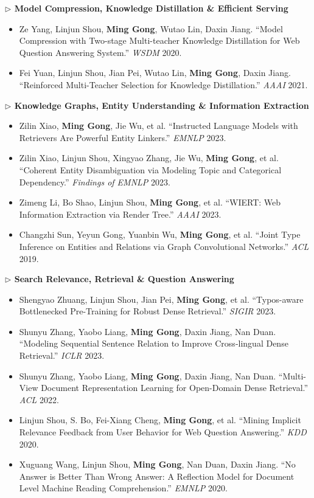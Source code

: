 \documentclass[10.5pt,letterpaper]{article}
\begin{document}
\noindent\textcolor{blue!60!black}{\textbf{$\triangleright$ Model Compression, Knowledge Distillation \& Efficient Serving}}
\begin{itemize}
  \item Ze Yang, Linjun Shou, \textbf{Ming Gong}, Wutao Lin, Daxin Jiang. ``Model Compression with Two-stage Multi-teacher Knowledge Distillation for Web Question Answering System.'' \textit{WSDM} 2020.
  \item Fei Yuan, Linjun Shou, Jian Pei, Wutao Lin, \textbf{Ming Gong}, Daxin Jiang. ``Reinforced Multi-Teacher Selection for Knowledge Distillation.'' \textit{AAAI} 2021.
\end{itemize}

\noindent\textcolor{blue!60!black}{\textbf{$\triangleright$ Knowledge Graphs, Entity Understanding \& Information Extraction}}
\begin{itemize}
  \item Zilin Xiao, \textbf{Ming Gong}, Jie Wu, et al. ``Instructed Language Models with Retrievers Are Powerful Entity Linkers.'' \textit{EMNLP} 2023.
  \item Zilin Xiao, Linjun Shou, Xingyao Zhang, Jie Wu, \textbf{Ming Gong}, et al. ``Coherent Entity Disambiguation via Modeling Topic and Categorical Dependency.'' \textit{Findings of EMNLP} 2023.
  \item Zimeng Li, Bo Shao, Linjun Shou, \textbf{Ming Gong}, et al. ``WIERT: Web Information Extraction via Render Tree.'' \textit{AAAI} 2023.
  \item Changzhi Sun, Yeyun Gong, Yuanbin Wu, \textbf{Ming Gong}, et al. ``Joint Type Inference on Entities and Relations via Graph Convolutional Networks.'' \textit{ACL} 2019.
\end{itemize}

\noindent\textcolor{blue!60!black}{\textbf{$\triangleright$ Search Relevance, Retrieval \& Question Answering}}
\begin{itemize}
  \item Shengyao Zhuang, Linjun Shou, Jian Pei, \textbf{Ming Gong}, et al. ``Typos-aware Bottlenecked Pre-Training for Robust Dense Retrieval.'' \textit{SIGIR} 2023.
  \item Shunyu Zhang, Yaobo Liang, \textbf{Ming Gong}, Daxin Jiang, Nan Duan. ``Modeling Sequential Sentence Relation to Improve Cross-lingual Dense Retrieval.'' \textit{ICLR} 2023.
  \item Shunyu Zhang, Yaobo Liang, \textbf{Ming Gong}, Daxin Jiang, Nan Duan. ``Multi-View Document Representation Learning for Open-Domain Dense Retrieval.'' \textit{ACL} 2022.
  \item Linjun Shou, S. Bo, Fei-Xiang Cheng, \textbf{Ming Gong}, et al. ``Mining Implicit Relevance Feedback from User Behavior for Web Question Answering.'' \textit{KDD} 2020.
  \item Xuguang Wang, Linjun Shou, \textbf{Ming Gong}, Nan Duan, Daxin Jiang. ``No Answer is Better Than Wrong Answer: A Reflection Model for Document Level Machine Reading Comprehension.'' \textit{EMNLP} 2020.
\end{itemize}
\end{document}
